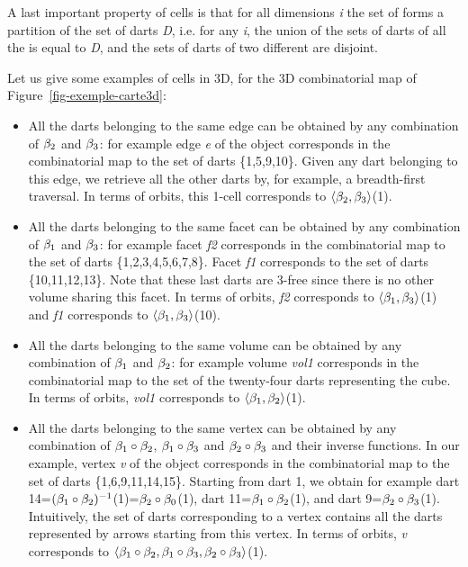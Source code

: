 A last important property of cells is that for all dimensions \emph{i} the
set of  forms a partition of the set of darts \emph{D}, i.e.  for
any \emph{i}, the union of the sets of darts of all the  is equal
to \emph{D}, and the sets of darts of two different  are disjoint.

Let us give some examples of cells in 3D, for the 3D combinatorial map
of Figure~\ref{fig-exemple-carte3d}:
\begin{itemize}
\item All the darts belonging to the same edge can be obtained by any
  combination of $\beta_{2}$ and $\beta_{3}$: for example edge \emph{e} of the
  object corresponds in the combinatorial map to the set of darts
  \{1,5,9,10\}. Given any dart belonging to this edge, we retrieve
  all the other darts by, for example, a breadth-first traversal. In terms
  of orbits, this 1-cell corresponds to $\langle{}\beta_2,\beta_3\rangle{}$(1).

\item All the darts belonging to the same facet can be obtained by any
  combination of $\beta_{1}$ and $\beta_{3}$: for example facet \emph{f2}
  corresponds in the combinatorial map to the set of darts
  \{1,2,3,4,5,6,7,8\}. Facet \emph{f1} corresponds to the set of darts
  \{10,11,12,13\}. Note that these last darts are 3-free since
  there is no other volume sharing this facet.  In terms of orbits,
  \emph{f2} corresponds to $\langle{}\beta_1,\beta_3\rangle{}$(1) and \emph{f1}
  corresponds to $\langle{}\beta_1,\beta_3\rangle{}$(10).

\item All the darts belonging to the same volume can be obtained by
  any combination of $\beta_{1}$ and $\beta_{2}$: for example volume \emph{vol1}
  corresponds in the combinatorial map to the set of the twenty-four
  darts representing the cube. In terms of orbits, \emph{vol1} corresponds
  to $\langle{}\beta_1,\beta_2\rangle{}$(1).

\item All the darts belonging to the same vertex can be obtained by
  any combination of $\beta_{1}\circ\beta_{2}$,
  $\beta_{1}\circ\beta_{3}$ and $\beta_{2}\circ\beta_{3}$ and their inverse
  functions.  In our example, vertex \emph{v} of the object corresponds
  in the combinatorial map to the set of darts \{1,6,9,11,14,15\}.
  Starting from dart 1, we obtain for example dart
  14=$(\beta_{1}\circ\beta_{2})^{-1}$(1)=$\beta_{2}\circ\beta_{0}$(1), dart
  11=$\beta_{1}\circ\beta_{2}$(1), and dart 9=$\beta_{2}\circ\beta_{3}$(1).
  Intuitively, the set of darts corresponding to a vertex contains all
  the darts represented by arrows starting from this vertex.  In terms
  of orbits, \emph{v} corresponds to $\langle{}\beta_1 \circ \beta_2,
    \beta_1 \circ \beta_3, \beta_2 \circ \beta_3\rangle{}$(1).
\end{itemize}

